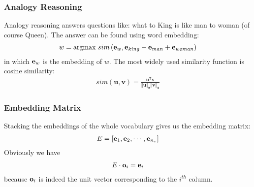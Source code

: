 \subsubsection{Analogy Reasoning}
Analogy reasoning answers questions like: what to King is like man to woman (of course Queen). The answer can be found using word embedding:
\begin{align*}
  w=\text{argmax }sim\left(\mathbf{e}_{w}, \mathbf{e}_{king} - \mathbf{e}_{man} + \mathbf{e}_{woman}\right)
\end{align*}
in which $\mathbf{e}_{w}$ is the embedding of $w$. The most widely used similarity function is cosine similarity: 
\begin{align*}
  sim\mathbf{(u, v)=\frac{u^{\mathsf{T}}v}{\Vert u\Vert_2\Vert v\Vert_2}}
\end{align*}
\subsubsection{Embedding Matrix}
Stacking the embeddings of the whole vocabulary gives us the embedding matrix:
\begin{align*}
  E=\left[\mathbf{e}_{1}, \mathbf{e}_{2}, \cdots, \mathbf{e}_{n_v}\right]
\end{align*}
Obviously we have
\begin{align*}
  E\cdot \mathbf{o}_{i}=\mathbf{e}_{i}
\end{align*}
because $\mathbf{o}_{i}$ is indeed the unit vector corresponding to the $i^{th}$ column.

